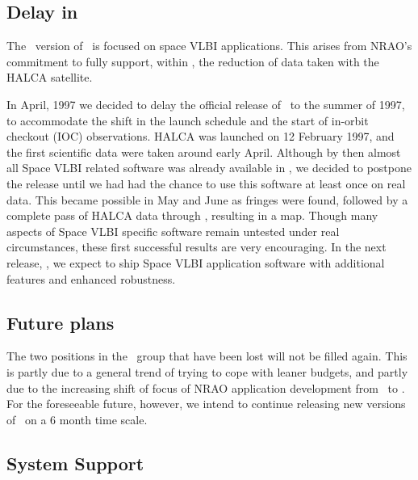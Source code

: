 \subsection{Delay in \RELEASENAME}

The \RELEASENAME\ version of \AIPS\ is focused on space VLBI
applications.  This arises from NRAO's commitment to fully support,
within \AIPS, the reduction of data taken with the HALCA satellite.

In April, 1997 we decided to delay the official release of
\RELEASENAME\ to the summer of 1997, to accommodate the shift in the
launch schedule and the start of in-orbit checkout (IOC) observations.
HALCA was launched on 12 February 1997, and the first scientific data
were taken around early April.  Although by then almost all Space VLBI
related software was already available in \AIPS, we decided to
postpone the release until we had had the chance to use this software
at least once on real data.  This became possible in May and June as
fringes were found, followed by a complete pass of HALCA data through
\AIPS, resulting in a map.  Though many aspects of Space VLBI specific
software remain untested under real circumstances, these first
successful results are very encouraging.  In the next release,
\NEXTNAME, we expect to ship Space VLBI application software with
additional features and enhanced robustness.


\subsection{Future plans}

The two positions in the \AIPS\ group that have been lost will not be
filled again.  This is partly due to a general trend of trying to cope
with leaner budgets, and partly due to the increasing shift of focus
of NRAO application development from \AIPS\ to \AIPTOO.  For the
foreseeable future, however, we intend to continue releasing new
versions of \AIPS\ on a 6 month time scale.

\subsection{System Support}

